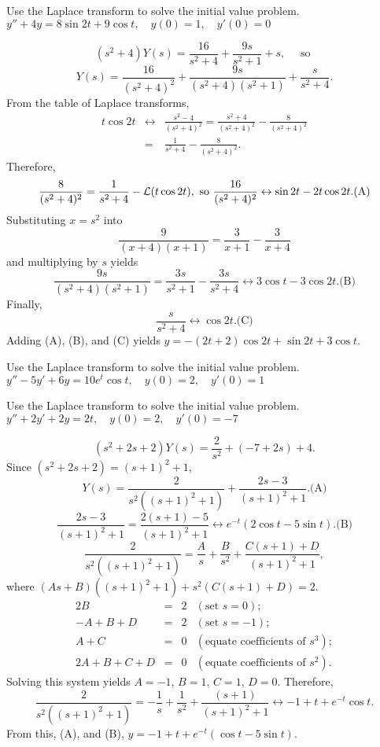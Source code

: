 \documentclass{ximera}
\begin{document}
\begin{problem}\label{exer:8.3.26} Use the Laplace transform to solve the initial value problem.  $y''+4y=8\sin2t+9\cos t, \quad  y(0)=1,\quad y'(0)=0$

\begin{solution}
$$
(s^2+4)Y(s)=\frac{16}{s^2+4}+\frac{9s}{s^2+1}+s,\quad \mbox{ so }
$$
$$
Y(s)=\frac{16}{(s^2+4)^2}+\frac{9s}{(s^2+4)(s^2+1)}+\frac{s}{s^2+4}.
$$
From the table of Laplace transforms,
\begin{eqnarray*}
t\cos2t&\leftrightarrow&\frac{s^2-4}{(s^2+4)^2}=\frac{s^2+4}{(s^2+4)^2}
-\frac{8}{(s^2+4)^2}\\
&=&\frac{1}{s^2+4}-\frac{8}{(s^2+4)^2}.
\end{eqnarray*}
Therefore,
$$
\frac{8}{(s^2+4)^2}=\frac{1}{s^2+4}-{\cal L}(t\cos2t),
\mbox{ so }
\frac{16}{(s^2+4)^2}\leftrightarrow\sin2t-2t\cos2t.
\text{(A)}
$$
Substituting $x=s^2$ into
$$
\frac{9}{(x+4)(x+1)}=\frac{3}{x+1}-\frac{3}{x+4}
$$
and multiplying  by $s$ yields
$$
\frac{9s}{(s^2+4)(s^2+1)}=\frac{3s}{s^2+1}-\frac{3s}{s^2+4}
\leftrightarrow 3\cos t-3\cos2t.
\text{(B)}
$$
Finally,
$$
\frac{s}{s^2+4}\leftrightarrow\cos2t.
\text{(C)}
$$
Adding (A), (B), and (C) yields
$y=-(2t+2)\cos2t+\sin2t+3\cos t$.
\end{solution}
\end{problem}

\begin{problem}\label{exer:8.3.27} Use the Laplace transform to solve the initial value problem. $y''-5y'+6y=10e^t\cos t, \quad  y(0)=2,\quad y'(0)=1$
\end{problem}

\begin{problem}\label{exer:8.3.28} Use the Laplace transform to solve the initial value problem. $y''+2y'+2y=2t, \quad  y(0)=2,\quad y'(0)=-7$

\begin{solution}
$$
(s^2+2s+2)Y(s)=\frac{2}{s^2}+(-7+2s)+4.
$$
Since $(s^2+2s+2)=(s+1)^2+1$,
$$
Y(s)=\frac{2}{s^2((s+1)^2+1)}+\frac{2s-3}{(s+1)^2+1}.
\text{(A)}
$$
$$
\frac{2s-3}{(s+1)^2+1}=\frac{2(s+1)-5}{(s+1)^2+1}
\leftrightarrow e^{-t}(2\cos t-5\sin t).
\text{(B)}
$$
$$
\frac{2}{s^2((s+1)^2+1)}=\frac{A}{s}+\frac{B}{s^2}+\frac{C(s+1)+D}{(s+1)^2+1},
$$
where
$(As+B)\left((s+1)^2+1\right)+s^2\left(C(s+1)+D\right)=2$.
$$
\begin{array}{rcll}
2B&=&2&(\mbox{set }s=0);\\
-A+B+D&=&2&(\mbox{set }s=-1);\\
A+C&=&0&(\mbox{equate coefficients of }s^3);\\
2A+B+C+D&=&0&(\mbox{equate coefficients of }s^2).
\end{array}
$$
Solving this system yields $A=-1$, $B=1$, $C=1$, $D=0$. Therefore,
$$
\frac{2}{s^2((s+1)^2+1)}=-\frac{1}{s}+\frac{1}{s^2}+\frac{(s+1)}{(s+1)^2+1}\leftrightarrow-1+t+e^{-t}\cos t.
$$
From this, (A), and (B),
$y=-1+t+e^{-t}(\cos t-5\sin t)$.

\end{solution}
\end{problem}
\end{document}
